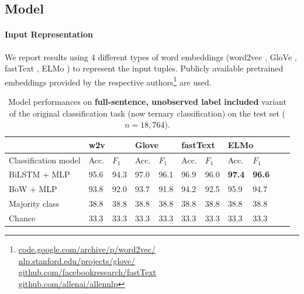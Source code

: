 \documentclass[letterpaper]{article} %
\begin{document}
\subsection{Model}
\label{ex1:model}
\paragraph{Input Representation} We report results using 4 different types of word embeddings (word2vec \cite{mikolov2013efficient}, GloVe \cite{pennington2014glove}, fastText \cite{bojanowski2016enriching}, ELMo \cite{peters2018deep}) to represent the input tuples. Publicly available pretrained embeddings provided by the respective authors\footnote{\url{code.google.com/archive/p/word2vec/}\\ \url{nlp.stanford.edu/projects/glove/}\\
\url{github.com/facebookresearch/fastText} \\
\url{github.com/allenai/allennlp}} are used.

\begin{table}[h]
\centering
\begin{tabular}{@{}lllllllllll@{}}
\toprule
& \multicolumn{2}{l}{w2v}  & \multicolumn{2}{l}{Glove} &  \multicolumn{2}{l}{fastText} & \multicolumn{2}{l}{ELMo}  \\ \midrule
Classification model       & Acc. & $F_1$ & Acc. & $F_1$ & Acc. & $F_1$ & Acc. & $F_1$   \\ \midrule
BiLSTM + MLP &  95.6  & 94.3 \hspace{1cm} & 97.0  & 96.1  \hspace{1cm} & 96.9 & 96.0  \hspace{1cm} & \textbf{97.4} & \textbf{96.6} \\
BoW + MLP & 93.8 & 92.0& 93.7& 91.8& 94.2 & 92.5& 95.9 & 94.7 \\
Majority class & 38.8 & 38.8 & 38.8 & 38.8 & 38.8 & 38.8 & 38.8 & 38.8 \\
Chance       & 33.3  & 33.3  & 33.3 & 33.3 & 33.3 & 33.3 & 33.3  & 33.3  \\
\bottomrule
\end{tabular}
\caption{Model performances on \textbf{full-sentence, unobserved label included} variant of the original classification task (now ternary classification) on the test set ($n=18,764$).}
\label{ex1-2:full sentence task}
\end{table}
\end{document}
